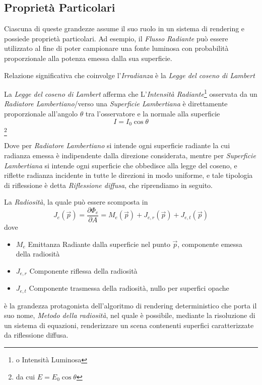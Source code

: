 \subsection{Propriet\`a Particolari}
Ciascuna di queste grandezze assume il suo ruolo in un sistema di rendering e possiede propriet\`a particolari. Ad esempio, il \textit{Flusso Radiante}
pu\`o essere utilizzato al fine di poter campionare una fonte luminosa con probabilit\`a proporzionale alla potenza emessa dalla sua superficie.\par
Relazione significativa che coinvolge l'\textit{Irradianza} \`e la \textit{Legge del coseno di Lambert}
\begin{definitionS}
	La \textit{Legge del coseno di Lambert} afferma che L'\textit{Intensit\`a Radiante}\footnote{o Intensit\`a Luminosa} osservata da un 
	\textit{Radiatore Lambertiano}/verso una \textit{Superficie Lambertiana} \`e direttamente proporzionale all'angolo $\theta$ tra l'osservatore e la
	normale alla superficie
	\[ I = I_0\cos\theta \]\footnote{da cui $E = E_0\cos\theta$}
\end{definitionS}
Dove per \textit{Radiatore Lambertiano} si intende ogni superficie radiante la cui radianza emessa \`e indipendente dalla direzione considerata, mentre
per \textit{Superficie Lambertiana} si intende ogni superficie che obbedisce alla legge del coseno, e riflette radianza incidente in tutte le direzioni
in modo uniforme, e tale tipologia di riflessione \`e detta \textit{Riflessione diffusa}, che riprendiamo in seguito.\par 
La \textit{Radiosit\`a}, la quale pu\`o essere scomposta in 
\[ J_e(\vec{p}) = \frac{\partial \Phi_e}{\partial A} = M_e(\vec{p}) + J_{e,r}(\vec{p}) + J_{e,t}(\vec{p}) \]
dove 
\begin{itemize}[topsep=0pt, noitemsep]
	\item $M_e$ Emittanza Radiante dalla superficie nel punto $\vec{p}$, componente emessa della radiosit\`a
	\item $J_{e,r}$ Componente riflessa della radiosit\`a
	\item $J_{e,t}$ Componente trasmessa della radiosit\`a, nullo per superfici opache
\end{itemize}
\`e la grandezza protagonista dell'algoritmo di rendering deterministico che porta il suo nome, \textit{Metodo della radiosit\`a}, nel quale \`e 
possibile, mediante la risoluzione di un sistema di equazioni, renderizzare un scena contenenti superfici caratterizzate da riflessione diffusa.\par
